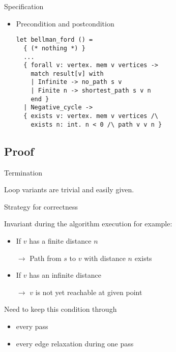 \documentclass{beamer}
\begin{document}
\begin{frame}[fragile]{Specification}

\begin{itemize}

\item \alert{Precondition} and \alert{postcondition}

\begin{lstlisting}[language=why3]
let bellman_ford () =
  { (* nothing *) }
  ...
  { forall v: vertex. mem v vertices ->
    match result[v] with
    | Infinite -> no_path s v
    | Finite n -> shortest_path s v n
    end }
  | Negative_cycle ->
  { exists v: vertex. mem v vertices /\
    exists n: int. n < 0 /\ path v v n }
\end{lstlisting}

\end{itemize}

\end{frame}

\subsection{Proof}

\begin{frame}[fragile]{Termination}

Loop variants are trivial and easily given.\vspace*{12pt}

\begin{algorithmic}[1]
\ENDFOR
\ENDFOR
{}
\ENDIF
\ENDFOR
{}
\end{algorithmic}

\end{frame}

\begin{frame}{Strategy for correctness}

Invariant during the algorithm execution for example:

\begin{itemize}

\item If $v$ has a \alert{finite} distance $n$

$\to$ Path from $s$ to $v$ with distance $n$ exists

\item If $v$ has an \alert{infinite} distance

$\to$ $v$ is not yet reachable at given point

\end{itemize}

\pause

\vspace{24pt}Need to keep this condition through
\begin{itemize}
\item every pass
\item every edge relaxation during one pass
\end{itemize} 

\end{frame}
\end{document}

